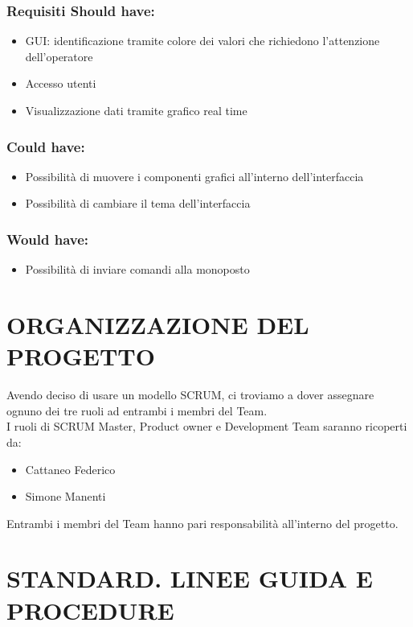 \documentclass{report}
\begin{document}
\subsection*{Requisiti Should have:}
\begin{itemize}
\item GUI: identificazione tramite colore dei valori che richiedono l'attenzione dell'operatore
\item Accesso utenti
\item Visualizzazione dati tramite grafico real time
\end{itemize}

\subsection*{Could have:}
\begin{itemize}
\item Possibilità di muovere i componenti grafici all'interno dell'interfaccia
\item Possibilità di cambiare il tema dell'interfaccia
\end{itemize}

\subsection*{Would have:}
\begin{itemize}
\item Possibilità di inviare comandi alla monoposto
\end{itemize}


\chapter{ORGANIZZAZIONE DEL PROGETTO}
Avendo deciso di usare un modello SCRUM, ci troviamo a dover assegnare ognuno dei tre ruoli ad entrambi i membri del Team.\\
I ruoli di SCRUM Master, Product owner e Development Team saranno ricoperti da:
\begin{itemize}
\item Cattaneo Federico
\item Simone Manenti
\end{itemize}
Entrambi i membri del Team hanno pari responsabilità all'interno del progetto.

\begingroup
\let\clearpage\relax
\chapter{STANDARD. LINEE GUIDA E PROCEDURE}
\endgroup
\end{document}
